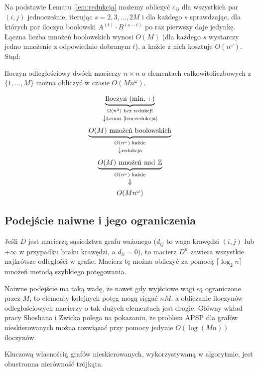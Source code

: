 Na podstawie Lematu \ref{lem:redukcja} możemy obliczyć $c_{ij}$
dla wszystkich par $(i,j)$ jednocześnie, iterując $s = 2, 3, \ldots, 2M$
i dla każdego $s$ sprawdzając, dla których par iloczyn boolowski
$A^{(t)} \cdot B^{(s-t)}$ po raz pierwszy daje jedynkę.
Łączna liczba mnożeń boolowskich wynosi $O(M)$ (dla każdego $s$
wystarczy jedno mnożenie z odpowiednio dobranym $t$), a każde
z nich kosztuje $O(n^\omega)$. Stąd:

\begin{twierdzenie}
\label{thm:dist-product}
Iloczyn odległościowy dwóch macierzy $n \times n$ o elementach
całkowitoliczbowych z $\{1, \ldots, M\}$ można obliczyć
w czasie $O(Mn^\omega)$.
\end{twierdzenie}

\[
\begin{array}{c}
\underbrace{\text{Iloczyn } (\min,+)}_{\Omega(n^3) \text{ bez redukcji}} \\[6pt]
\downarrow \scriptstyle{\text{Lemat \ref{lem:redukcja}}} \\[6pt]
\underbrace{O(M) \text{ mnożeń boolowskich}}_{O(n^\omega) \text{ każde}} \\[6pt]
\downarrow \scriptstyle{\text{redukcja}} \\[6pt]
\underbrace{O(M) \text{ mnożeń nad } \mathbb{Z}}_{O(n^\omega) \text{ każde}} \\[6pt]
\Downarrow \\[4pt]
O(Mn^\omega)
\end{array}
\]

\subsection{Podejście naiwne i jego ograniczenia}
Jeśli $D$ jest macierzą sąsiedztwa grafu ważonego ($d_{ij}$ to waga krawędzi $(i,j)$ lub $+\infty$ w przypadku braku krawędzi, a $d_{ii} = 0$), to macierz $D^n$ zawiera wszystkie najkrótsze odległości w grafie. Macierz tę można obliczyć za pomocą $\lceil \log_2 n \rceil$ mnożeń metodą szybkiego potęgowania.

Naiwne podejście ma taką wadę, że nawet gdy wyjściowe wagi są ograniczone przez $M$, to elementy kolejnych potęg mogą sięgać $nM$, a obliczanie iloczynów odległościowych macierzy o tak dużych elementach jest drogie. Główny wkład pracy Shoshana i Zwicka polega na pokazaniu, że problem APSP dla grafów nieskierowanych można rozwiązać przy pomocy jedynie $O(\log(Mn))$ iloczynów.

Kluczową własnością grafów nieskierowanych, wykorzystywaną w algorytmie, jest obustronna nierówność trójkąta.

